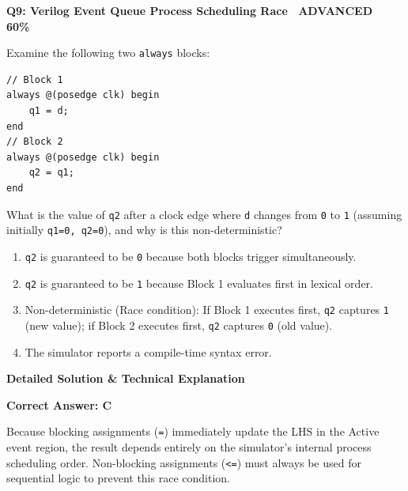 \documentclass[11pt,a4paper]{article}
\newcommand{\badgeadv}{{\color{white}\colorbox{advred}{\bfseries\sffamily\tiny\ ADVANCED 60\%\ }}}
\newenvironment{qbox}[2]{%
  \begin{mdframed}[style=qstyle]%
  {\bfseries\sffamily\color{primaryblue}#1 \hfill #2}\par\vspace{2pt}%
}{%
  \end{mdframed}%
}
\newenvironment{ansbox}{%
  \begin{mdframed}[style=ansstyle]%
  {\bfseries\sffamily\color{ansgreen}\small Detailed Solution \& Technical Explanation}\par\vspace{2pt}\small%
}{%
  \end{mdframed}%
}
\begin{document}
\begin{qbox}{Q9: Verilog Event Queue Process Scheduling Race}{\badgeadv}
Examine the following two \texttt{always} blocks:
\begin{lstlisting}[style=verilogstyle]
// Block 1
always @(posedge clk) begin
    q1 = d;
end
// Block 2
always @(posedge clk) begin
    q2 = q1;
end
\end{lstlisting}
What is the value of \texttt{q2} after a clock edge where \texttt{d} changes from \texttt{0} to \texttt{1} (assuming initially \texttt{q1=0, q2=0}), and why is this non-deterministic?
\begin{enumerate}[label=\textbf{\Alph*.}]
  \item \texttt{q2} is guaranteed to be \texttt{0} because both blocks trigger simultaneously.
  \item \texttt{q2} is guaranteed to be \texttt{1} because Block 1 evaluates first in lexical order.
  \item Non-deterministic (Race condition): If Block 1 executes first, \texttt{q2} captures \texttt{1} (new value); if Block 2 executes first, \texttt{q2} captures \texttt{0} (old value).
  \item The simulator reports a compile-time syntax error.
\end{enumerate}
\end{qbox}
\begin{ansbox}
\textbf{Correct Answer: C}

Because blocking assignments (\texttt{=}) immediately update the LHS in the Active event region, the result depends entirely on the simulator's internal process scheduling order. Non-blocking assignments (\texttt{<=}) must always be used for sequential logic to prevent this race condition.
\end{ansbox}
\end{document}
